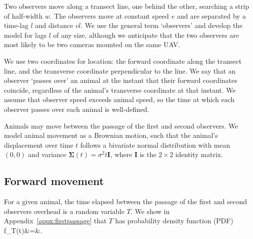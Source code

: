 \documentclass[useAMS, usenatbib, referee]{biom}\usepackage[]{graphicx}\usepackage[]{color}
\begin{document}

Two observers move along a transect line, one behind the other, searching a strip of half-width $w$. The observers move at constant speed $v$ and are separated by a time-lag $l$ and distance $vl$. We use the general term `observers' and develop the model for lags $l$ of any size, although we anticipate that the two observers are most likely to be two cameras mounted on the same UAV.

We use two coordinates for location: the forward coordinate along the transect line, and the transverse coordinate perpendicular to the line. We say that an observer `passes over' an animal at the instant that their forward coordinates coincide, regardless of the animal's transverse coordinate at that instant. We assume that observer speed exceeds animal speed, so the time at which each observer passes over each animal is well-defined.

Animals may move between the passage of the first and second observers. We model animal movement as a Brownian motion, such that the animal's displacement over time $t$ follows a bivariate normal distribution with mean $(0,0)$ and variance $\bm{\Sigma}(t)=\sigma^2t\bm{I}$, where $\bm{I}$ is the $2\times 2$ identity matrix.


\subsection{Forward movement}

For a given animal, the time elapsed between the passage of the first and second observers overhead is a random variable $T$. We show in Appendix~\ref{appx:firstpassage} that $T$ has probability density function (PDF)
\be
f_{T}(t)&=&.
\label{eq:fTt}
\ee




\end{document}
